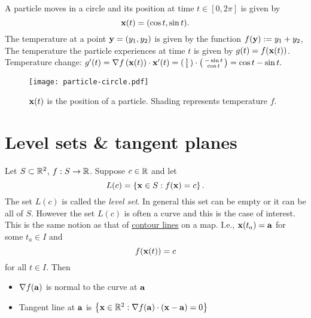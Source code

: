 \begin{example*}
    A particle moves in a circle and its position at time \(t\in [0,2\pi]\) is given by
    \[
        \xx(t) = (\cos t, \sin t).
    \]
    The temperature at a point \(\yy=(y_1,y_2)\) is given by the function \(f(\yy) := y_1 + y_2\),
    The temperature the particle experiences at time \(t\) is given by \(g(t) = f (\xx(t))\).
    Temperature change:
    \(
    g'(t)
    = \nabla f \left(\xx(t)\right) \cdot \xx'(t)
    = \left(\begin{smallmatrix}
            1 \\
            1
        \end{smallmatrix}\right)
    \cdot
    \left( \begin{smallmatrix}
            -\sin t \\
            \cos t
        \end{smallmatrix}\right)
    = \cos t - \sin t.
    \)
\end{example*}

\begin{figure}
    \begin{center}
        \texttt{[image: particle-circle.pdf]}
        \caption{\(\xx(t)\) is the position of a particle. Shading represents temperature \(f\).}
        \label{fig:particle-circle}
    \end{center}
\end{figure}


\section{Level sets \& tangent planes}

Let \(S\subset \bR^2\), \(f:S\to\bR\).
Suppose \(c\in \bR\) and let
\[
    L(c) = \left\{\xx\in S : f(\xx)=c\right\}.
\]
The set \(L(c)\) is called the \emph{level set}.
In general this set can be empty or it can be all of \(S\).
However the set \(L(c)\) is often a curve and this is the case of interest.
This is the same notion as that of \href{https://en.wikipedia.org/wiki/Contour_line}{contour lines} on a map.
I.e., \(\xx(t_a) = \aa\) for some \(t_a \in I\) and \[f(\xx(t))=c\] for all \(t\in I\).
Then
\begin{itemize}
    \item \(\nabla f(\aa)\) is normal to the curve at \(\aa\)
    \item Tangent line at \(\aa\) is
          \(\left\{\xx\in\bR^2: \nabla f(\aa) \cdot (\xx-\aa)=0\right\}\)
\end{itemize}

